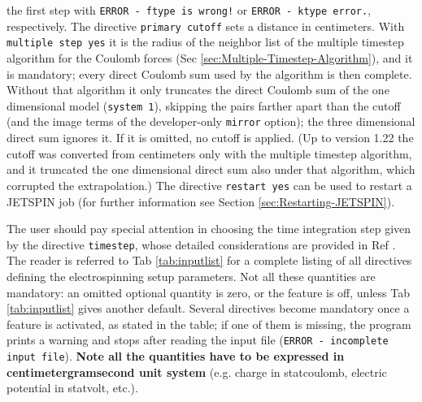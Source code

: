 the first step with \texttt{ERROR - ftype is wrong!} or \texttt{ERROR -
ktype error.}, respectively. The directive \texttt{primary
cutoff} sets a distance in centimeters. With \texttt{multiple step yes}
it is the radius of the neighbor list of the multiple timestep algorithm
for the Coulomb forces (Sec \ref{sec:Multiple-Timestep-Algorithm}), and it
is mandatory; every direct Coulomb sum used by the algorithm is then
complete. Without that algorithm it only truncates the direct Coulomb sum
of the one dimensional model (\texttt{system 1}), skipping the pairs
farther apart than the cutoff (and the image terms of the developer-only
\texttt{mirror} option); the three dimensional direct sum ignores
it. If it is omitted, no cutoff is applied. (Up to version 1.22 the
cutoff was converted from centimeters only with the multiple timestep
algorithm, and it truncated the one dimensional direct sum also under
that algorithm, which corrupted the extrapolation.)
The directive \texttt{restart yes} can be used to restart a JETSPIN
job (for further information see Section \ref{sec:Restarting-JETSPIN}).

The user should pay special attention in choosing the time integration
step given by the directive \texttt{timestep}, whose detailed considerations
are provided in Ref \cite{lauricella2015jetspin}. The reader is referred
to Tab \ref{tab:inputlist} for a complete listing of all directives
defining the electrospinning setup parameters. Not all these quantities
are mandatory: an omitted optional quantity is zero, or the feature is
off, unless Tab \ref{tab:inputlist} gives another default. Several
directives become mandatory once a feature is activated, as stated in the
table; if one of them is missing, the program prints a warning and stops
after reading the input file (\texttt{ERROR - incomplete input file}).
\textbf{Note all the quantities
have to be expressed in centimeter\textendash gram\textendash second
unit system} (e.g. charge in statcoulomb, electric potential in statvolt,
etc.).

